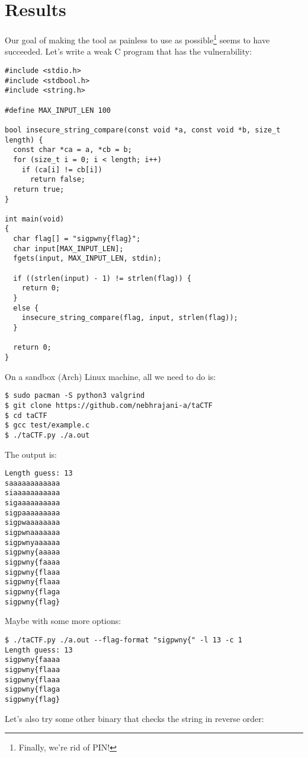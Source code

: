 \documentclass[11pt]{article}
\begin{document}
\section{Results}
\label{sec:orgfa3e5db}

Our goal of making the tool as painless to use as possible\footnote{Finally, we're rid of PIN!} seems to have
succeeded. Let's write a weak C program that has the vulnerability:

\begin{verbatim}
#include <stdio.h>
#include <stdbool.h>
#include <string.h>

#define MAX_INPUT_LEN 100

bool insecure_string_compare(const void *a, const void *b, size_t length) {
  const char *ca = a, *cb = b;
  for (size_t i = 0; i < length; i++)
    if (ca[i] != cb[i])
      return false;
  return true;
}

int main(void)
{
  char flag[] = "sigpwny{flag}";
  char input[MAX_INPUT_LEN];
  fgets(input, MAX_INPUT_LEN, stdin);

  if ((strlen(input) - 1) != strlen(flag)) {
    return 0;
  }
  else {
    insecure_string_compare(flag, input, strlen(flag));
  }

  return 0;
}
\end{verbatim}

On a sandbox (Arch) Linux machine, all we need to do is:
\begin{verbatim}
$ sudo pacman -S python3 valgrind
$ git clone https://github.com/nebhrajani-a/taCTF
$ cd taCTF
$ gcc test/example.c
$ ./taCTF.py ./a.out
\end{verbatim}

The output is:

\begin{verbatim}
Length guess: 13
saaaaaaaaaaaa
siaaaaaaaaaaa
sigaaaaaaaaaa
sigpaaaaaaaaa
sigpwaaaaaaaa
sigpwnaaaaaaa
sigpwnyaaaaaa
sigpwny{aaaaa
sigpwny{faaaa
sigpwny{flaaa
sigpwny{flaaa
sigpwny{flaga
sigpwny{flag}
\end{verbatim}

Maybe with some more options:

\begin{verbatim}
$ ./taCTF.py ./a.out --flag-format "sigpwny{" -l 13 -c 1
Length guess: 13
sigpwny{faaaa
sigpwny{flaaa
sigpwny{flaaa
sigpwny{flaga
sigpwny{flag}
\end{verbatim}

Let's also try some other binary that checks the string in reverse
order:
\end{document}
